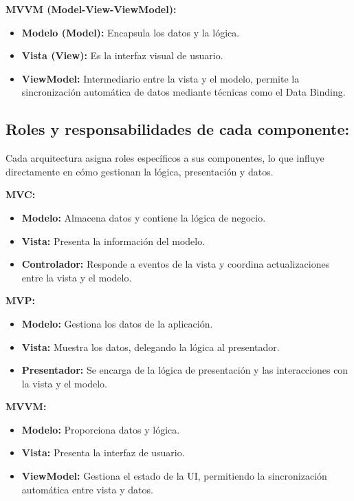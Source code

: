 \documentclass[letterpaper, 12pt]{report}
\begin{document}
\textbf{MVVM (Model-View-ViewModel):}
\begin{itemize}
    \item \textbf{Modelo (Model):} Encapsula los datos y la lógica.
    \item \textbf{Vista (View):} Es la interfaz visual de usuario.
    \item \textbf{ViewModel:} Intermediario entre la vista y el modelo, permite la sincronización automática de datos mediante técnicas como el Data Binding.
\end{itemize}

\subsection{Roles y responsabilidades de cada componente:}

Cada arquitectura asigna roles específicos a sus componentes, lo que influye directamente en cómo gestionan la lógica, presentación y datos.

\textbf{MVC:}
\begin{itemize}
    \item \textbf{Modelo:} Almacena datos y contiene la lógica de negocio.
    \item \textbf{Vista:} Presenta la información del modelo.
    \item \textbf{Controlador:} Responde a eventos de la vista y coordina actualizaciones entre la vista y el modelo.
\end{itemize}

\textbf{MVP:}
\begin{itemize}
    \item \textbf{Modelo:} Gestiona los datos de la aplicación.
    \item \textbf{Vista:} Muestra los datos, delegando la lógica al presentador.
    \item \textbf{Presentador:} Se encarga de la lógica de presentación y las interacciones con la vista y el modelo.
\end{itemize}

\textbf{MVVM:}
\begin{itemize}
    \item \textbf{Modelo:} Proporciona datos y lógica.
    \item \textbf{Vista:} Presenta la interfaz de usuario.
    \item \textbf{ViewModel:} Gestiona el estado de la UI, permitiendo la sincronización automática entre vista y datos.
\end{itemize}
\end{document}
